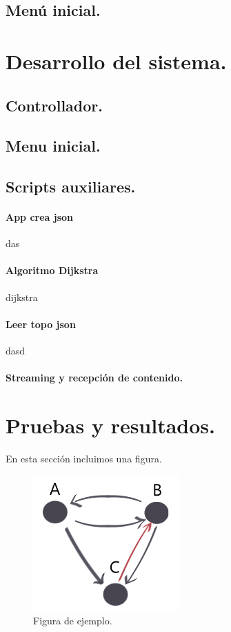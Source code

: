 \documentclass[12pt,a4paper,oneside]{book}
\begin{document}
\section{Menú inicial.}


\chapter{Desarrollo del sistema.}

\section{Controllador.}

\section{Menu inicial.}

\section{Scripts auxiliares.}

\subsubsection{App crea json}
das

\subsubsection{Algoritmo Dijkstra}
dijkstra
\subsubsection{Leer topo json}
dasd
\subsubsection{Streaming y recepción de contenido.}








\chapter{Pruebas y resultados.}
\label{pruebasyresultados}

En esta sección incluimos una figura.
\begin{figure}[ht]
 \centering
 \includegraphics[width=0.5\textwidth]{grafo.png}
 \caption{Figura de ejemplo.}
 \label{fig1}
\end{figure}
\end{document}
